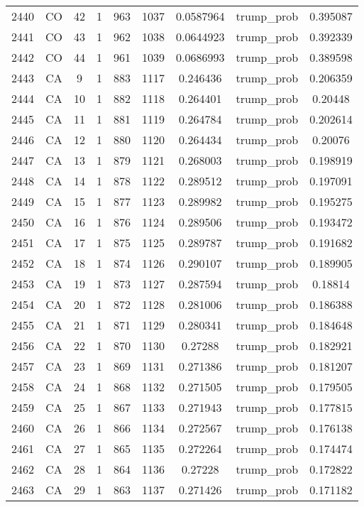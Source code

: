 \documentclass[12pt,a4paper]{article}
\begin{document}
\begin{tabular}{r|cccccccc}
	2440 & CO & 42 & 1 & 963 & 1037 & 0.0587964 & trump\_prob & 0.395087 \\
	2441 & CO & 43 & 1 & 962 & 1038 & 0.0644923 & trump\_prob & 0.392339 \\
	2442 & CO & 44 & 1 & 961 & 1039 & 0.0686993 & trump\_prob & 0.389598 \\
	2443 & CA & 9 & 1 & 883 & 1117 & 0.246436 & trump\_prob & 0.206359 \\
	2444 & CA & 10 & 1 & 882 & 1118 & 0.264401 & trump\_prob & 0.20448 \\
	2445 & CA & 11 & 1 & 881 & 1119 & 0.264784 & trump\_prob & 0.202614 \\
	2446 & CA & 12 & 1 & 880 & 1120 & 0.264434 & trump\_prob & 0.20076 \\
	2447 & CA & 13 & 1 & 879 & 1121 & 0.268003 & trump\_prob & 0.198919 \\
	2448 & CA & 14 & 1 & 878 & 1122 & 0.289512 & trump\_prob & 0.197091 \\
	2449 & CA & 15 & 1 & 877 & 1123 & 0.289982 & trump\_prob & 0.195275 \\
	2450 & CA & 16 & 1 & 876 & 1124 & 0.289506 & trump\_prob & 0.193472 \\
	2451 & CA & 17 & 1 & 875 & 1125 & 0.289787 & trump\_prob & 0.191682 \\
	2452 & CA & 18 & 1 & 874 & 1126 & 0.290107 & trump\_prob & 0.189905 \\
	2453 & CA & 19 & 1 & 873 & 1127 & 0.287594 & trump\_prob & 0.18814 \\
	2454 & CA & 20 & 1 & 872 & 1128 & 0.281006 & trump\_prob & 0.186388 \\
	2455 & CA & 21 & 1 & 871 & 1129 & 0.280341 & trump\_prob & 0.184648 \\
	2456 & CA & 22 & 1 & 870 & 1130 & 0.27288 & trump\_prob & 0.182921 \\
	2457 & CA & 23 & 1 & 869 & 1131 & 0.271386 & trump\_prob & 0.181207 \\
	2458 & CA & 24 & 1 & 868 & 1132 & 0.271505 & trump\_prob & 0.179505 \\
	2459 & CA & 25 & 1 & 867 & 1133 & 0.271943 & trump\_prob & 0.177815 \\
	2460 & CA & 26 & 1 & 866 & 1134 & 0.272567 & trump\_prob & 0.176138 \\
	2461 & CA & 27 & 1 & 865 & 1135 & 0.272264 & trump\_prob & 0.174474 \\
	2462 & CA & 28 & 1 & 864 & 1136 & 0.27228 & trump\_prob & 0.172822 \\
	2463 & CA & 29 & 1 & 863 & 1137 & 0.271426 & trump\_prob & 0.171182 \\

\end{tabular}
\end{document}
